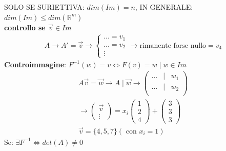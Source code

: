 \documentclass{article}
\begin{document}
SOLO SE SURIETTIVA: $dim(Im)=n$, IN GENERALE: $dim(Im)\leq dim(\mathbb{R}^m)$ \\
\textbf{controllo se $\vec{v}\in Im$}
\begin{align}
    A \to A'=\vec{v} \to \begin{cases}
        \dots=v_1 \\
        \dots=v_2 \\
        \vdots
    \end{cases}
    \to \boxed{\text{rimanente forse nullo}=v_4}
\end{align}
\textbf{Controimmagine}: $F^{-1}(w)=v \iff F(v)=w \mid w \in Im$
\begin{align}
    A\vec{v}=\vec{w} \to A\mid \vec{w} \to \begin{pmatrix}
        \dots & \mid & w_1\\
        \dots & \mid & w_2\\
    \end{pmatrix} \\
    \to \begin{pmatrix}
        \vec{v} \\
        \vdots
    \end{pmatrix}=x_i\begin{pmatrix}
        1 \\ 2 \\ 4
    \end{pmatrix}+\begin{pmatrix}
        3 \\ 3 \\ 3 
    \end{pmatrix} \\
    \vec{v}=\{4,5,7\} (\text{ con }x_i=1)
\end{align}
Se: $\exists F^{-1}\iff det(A)\neq0$
\end{document}
